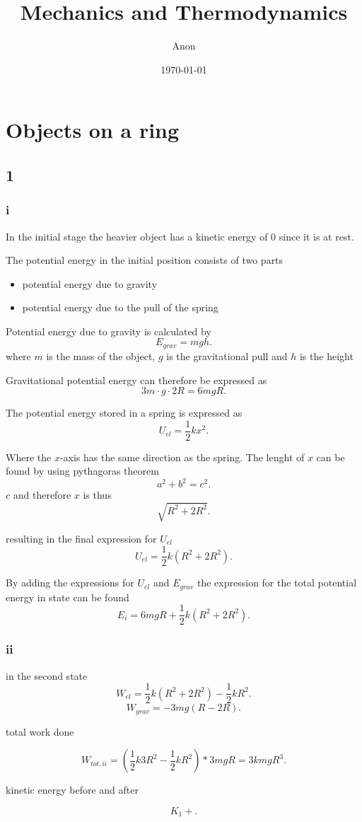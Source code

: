 \documentclass[12pt,a4paper]{article}
\title{Mechanics and Thermodynamics}
\author{Anon}
\date{\today}
\begin{document}
\maketitle
\section{Objects on a ring}

\subsection{1}

\subsubsection{i}

In the initial stage the heavier object has a kinetic energy of 0 since it is at rest.

The potential energy in the initial position consists of two parts

\begin{itemize}
	\item potential energy due to gravity
	\item potential energy due to the pull of the spring
\end{itemize}


Potential energy due to gravity is calculated by \[
	E_{grav}=mgh
.\] 
where $m$ is the mass of the object,  $g$ is the gravitational pull and $h$ is the height

Gravitational potential energy can therefore be expressed as \[
3m\cdot g\cdot 2R = 6mgR
.\] 

The potential energy stored in a spring is expressed as \[
U_{el} = \frac{1}{2}kx^2
.\] 

Where the $x$-axis has the same direction as the spring. The lenght of  $x$ can be found by using pythagoras theorem \[
a^{2}+b^{2}=c^{2}
.\] 
$c$ and therefore $x$ is thus \[
\sqrt{R^{2}+2R^{2}} 
.\] 

resulting in the final expression for $U_{el}$ \[
	U_{el}=\frac{1}{2}k\left( R^2+2R^2 \right) 
.\] 

By adding the expressions for $U_{el}$ and $E_{grav}$ the expression for the total potential energy in state can be found \[
	E_{i}=6mgR+\frac{1}{2}k\left( R^{2}+2R^{2} \right) 
.\] 

\subsubsection{ii}

in the second state 
\[
	W_{el}=\frac{1}{2}k\left( R^2+2R^2 \right) -\frac{1}{2}kR^2
.\] 
\[
	W_{grav}=-3mg\left( R-2R \right) 
.\] 

total work done 

\[
	W_{tot,ii}=(\frac{1}{2}k3R^2 -\frac{1}{2}kR^2)*3mgR=3kmgR^3
.\] 

kinetic energy before and after

\[
K_{1}+
.\] 
\end{document}
